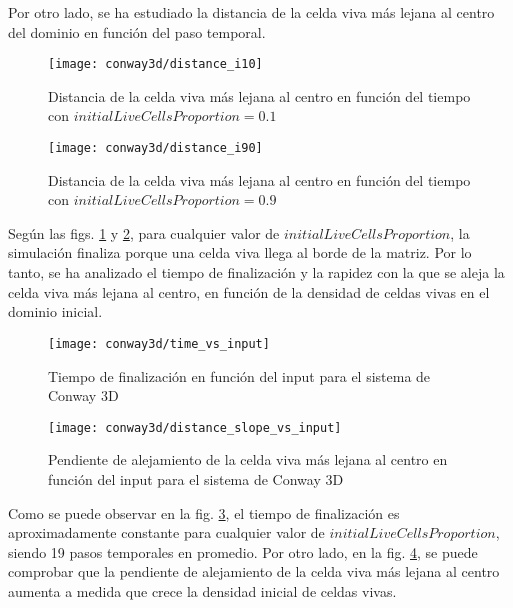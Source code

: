Por otro lado, se ha estudiado la distancia de la celda viva más lejana al centro del dominio en función del
paso temporal.

\begin{figure}[H]
    \centering
    \texttt{[image: conway3d/distance\_i10]}
    \caption{Distancia de la celda viva más lejana al centro en función del tiempo con $initialLiveCellsProportion = 0.1$}
    \label{fig:conway3d_d10}
\end{figure}
\begin{figure}[H]
    \centering
    \texttt{[image: conway3d/distance\_i90]}
    \caption{Distancia de la celda viva más lejana al centro en función del tiempo con $initialLiveCellsProportion = 0.9$}
    \label{fig:conway3d_d90}
\end{figure}

Según las figs. \ref{fig:conway3d_d10} y \ref{fig:conway3d_d90}, para cualquier valor de $initialLiveCellsProportion$,
la simulación finaliza porque una celda viva llega al borde de la matriz.
Por lo tanto, se ha analizado el tiempo de finalización y la rapidez con la que se aleja la celda viva más lejana
al centro, en función de la densidad de celdas vivas en el dominio inicial.

\begin{figure}[H]
    \centering
    \texttt{[image: conway3d/time\_vs\_input]}
    \caption{Tiempo de finalización en función del input para el sistema de Conway 3D}
    \label{fig:conway3d_time_vs_input}
\end{figure}
\begin{figure}[H]
    \centering
    \texttt{[image: conway3d/distance\_slope\_vs\_input]}
    \caption{Pendiente de alejamiento de la celda viva más lejana al centro en función del input para el sistema de Conway 3D}
    \label{fig:conway3d_distance_slope_vs_input}
\end{figure}

Como se puede observar en la fig. \ref{fig:conway3d_time_vs_input}, el tiempo de finalización es
aproximadamente constante para cualquier valor de $initialLiveCellsProportion$, siendo 19 pasos temporales en promedio.
Por otro lado, en la fig. \ref{fig:conway3d_distance_slope_vs_input}, se puede comprobar que la pendiente de alejamiento
de la celda viva más lejana al centro aumenta a medida que crece la densidad inicial de celdas vivas.



